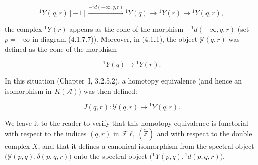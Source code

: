 \begin{equation}
{}^{1}\!Y(q,r)[-1]
\xrightarrow{-{}^{1}\!d(-\infty,q,r)}
{}^{1}\!Y(q)\longrightarrow{}^{1}\!Y(r)\longrightarrow{}^{1}\!Y(q,r),
\tag{4.1.7.8}
\end{equation}

the complex ${}^{1}\!Y(r)$ appears as the cone of the morphism
$-{}^{1}\!d(-\infty,q,r)$ (set $p=-\infty$ in diagram (4.1.7.7)).
Moreover, in (4.1.1), the object $\mathcal Y(q,r)$ was defined as the cone
of the morphism

\begin{equation}
{}^{1}\!Y(q)\longrightarrow{}^{1}\!Y(r).
\tag{4.1.7.9}
\end{equation}

In this situation (Chapter~I, 3.2.5.2), a homotopy equivalence (and hence
an isomorphism in $K(\mathcal A)$) was then defined:

\begin{equation}
J(q,r)\colon\mathcal Y(q,r)\longrightarrow{}^{1}\!Y(q,r).
\tag{4.1.7.10}
\end{equation}

We leave it to the reader to verify that this homotopy equivalence is
functorial with respect to the indices $(q,r)$ in
$\mathcal{F}\ell_1(\widetilde{\mathbb Z})$ and with respect to the double
complex $X$, and that it defines a canonical isomorphism from the spectral
object $\bigl(\mathcal Y(p,q),\delta(p,q,r)\bigr)$ onto the spectral object
$\bigl({}^{1}\!Y(p,q),{}^{1}\!d(p,q,r)\bigr)$.
\endgroup
